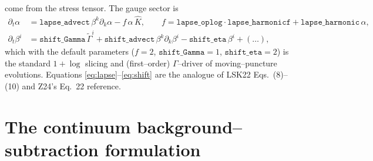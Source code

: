 \documentclass[11pt]{article}
\newcommand{\code}[1]{\texttt{#1}}
\newcommand{\Gamt}{\tilde\Gamma}
\begin{document}
come from the stress tensor. The gauge sector is
\begin{align}
  \partial_t\alpha &= \code{lapse\_advect}\,\beta^k\partial_k\alpha
       - f\,\alpha\,\hat K, \qquad
       f=\code{lapse\_oplog}\cdot\code{lapse\_harmonicf}+\code{lapse\_harmonic}\,\alpha,
    \label{eq:lapse}\\
  \partial_t\beta^i &= \code{shift\_Gamma}\,\Gamt^i
       + \code{shift\_advect}\,\beta^k\partial_k\beta^i
       - \code{shift\_eta}\,\beta^i + (\dots),
    \label{eq:shift}
\end{align}
which with the default parameters ($f=2$, $\code{shift\_Gamma}=1$,
$\code{shift\_eta}=2$) is the standard $1+\log$ slicing and (first--order)
$\Gamma$--driver of moving--puncture evolutions. Equations
\eqref{eq:lapse}--\eqref{eq:shift} are the analogue of LSK22 Eqs.~(8)--(10)
and Z24's Eq.~22 reference.

\section{The continuum background--subtraction formulation}
\end{document}
